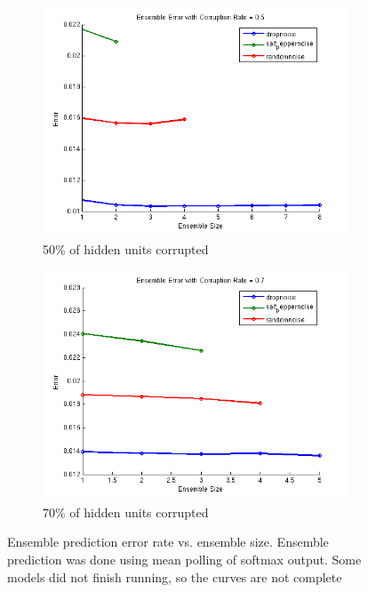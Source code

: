 \documentclass{article} %
\begin{document}
\begin{figure}
\centering
\begin{subfigure}{.5\textwidth}
  \centering
  \includegraphics[width=\textwidth]{ensemble05}
  \caption{50\% of hidden units corrupted}
  \label{fig:ect05}
\end{subfigure}%
\begin{subfigure}{.5\textwidth}
  \centering
  \includegraphics[width=\textwidth]{ensemble07}
  \caption{70\% of hidden units corrupted}
  \label{fig:ect07}
\end{subfigure}
\caption{Ensemble prediction error rate vs. ensemble size. Ensemble prediction was done using mean polling of softmax output. Some models did not finish running, so the curves are not complete}
\label{fig:ensemble_corruption_type}
\end{figure}
\end{document}
